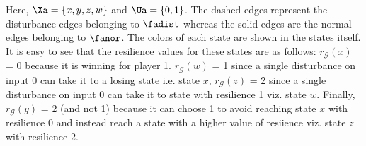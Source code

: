 
Here, $\Xa = \{x,y,z,w\}$ and $\Ua= \{0,1\}$. The dashed edges represent the disturbance edges belonging to $\fadist$ whereas the solid edges are the normal edges belonging to $\fanor$. The colors of each state are shown in the states itself. It is easy to see that the resilience values for these states are as follows: $r_\mathcal G(x)$ = 0 because it is winning for player 1. $r_\mathcal G(w)$ = 1 since a single disturbance on input 0 can take it to a losing state i.e. state $x$, $r_\mathcal G(z)$ = 2 since a single disturbance on input 0 can take it to state with resilience 1 viz. state $w$. Finally, $r_\mathcal G(y)$ = 2 (and not 1) because it can choose 1 to avoid reaching state $x$ with resilience 0 and instead reach a state with a higher value of resiience viz. state $z$ with resilience 2.\\ 

